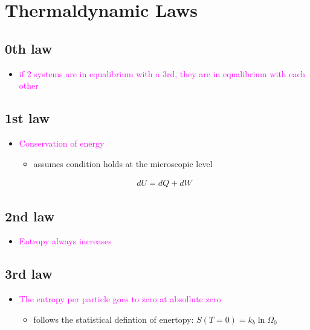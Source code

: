 

\section{Thermaldynamic Laws}

\subsection{0th law}
\begin{itemize}
    \item \textcolor{magenta}{if 2 systems are in equalibrium with a 3rd, they are in equalibrium 
    with each other} 
\end{itemize}


\subsection{1st law}
\begin{itemize}
    \item \textcolor{magenta}{Conservation of energy}
    \begin{itemize}
        \item assumes condition holds at the microscopic level
    \end{itemize}
    \begin{align}
        dU = dQ + dW
    \end{align}
\end{itemize}


\subsection{2nd law}
\begin{itemize}
    \item \textcolor{magenta}{Entropy always increases}
\end{itemize}


\subsection{3rd law}
\begin{itemize}
    \item \textcolor{magenta}{The entropy per particle goes to zero at absollute zero}
    \begin{itemize}
        \item follows the statistical defintion of enertopy: $S(T = 0) = k_b \ln \Omega_0$
    \end{itemize}
\end{itemize}
